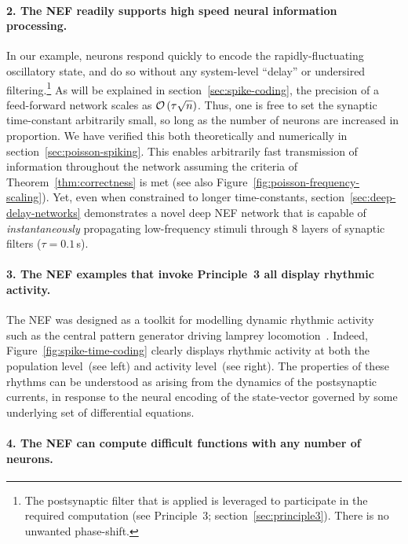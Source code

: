\paragraph{2. The NEF readily supports high speed neural information processing.}

In our example, neurons respond quickly to encode the rapidly-fluctuating oscillatory state, and do so without any system-level ``delay'' or undersired filtering.\footnote{%
The postsynaptic filter that is applied is leveraged to participate in the required computation (see Principle~3; section~\ref{sec:principle3}).
There is no unwanted phase-shift.
}
As will be explained in section~\ref{sec:spike-coding}, the precision of a feed-forward network scales as $\mathcal{O}\left({\tau \sqrt{n}}\right)$.
Thus, one is free to set the synaptic time-constant arbitrarily small, so long as the number of neurons are increased in proportion.
We have verified this both theoretically and numerically in section~\ref{sec:poisson-spiking}.
This enables arbitrarily fast transmission of information throughout the network assuming the criteria of Theorem~\ref{thm:correctness} is met (see also Figure~\ref{fig:poisson-frequency-scaling}).
Yet, even when constrained to longer time-constants, section~\ref{sec:deep-delay-networks} demonstrates a novel deep NEF network that is capable of \emph{instantaneously} propagating low-frequency stimuli through 8 layers of synaptic filters ($\tau = 0.1$\,s).

\paragraph{3. The NEF examples that invoke Principle~3 all display rhythmic activity.}

The NEF was designed as a toolkit for modelling dynamic rhythmic activity~\citep{eliasmith1999developing} such as the central pattern generator driving lamprey locomotion~\citep{eliasmith2000b}.
Indeed, Figure~\ref{fig:spike-time-coding} clearly displays rhythmic activity at both the population level~(see left) and activity level~(see right).
The properties of these rhythms can be understood as arising from the dynamics of the postsynaptic currents, in response to the neural encoding of the state-vector governed by some underlying set of differential equations.

\paragraph{4. The NEF can compute difficult functions with any number of neurons.}

